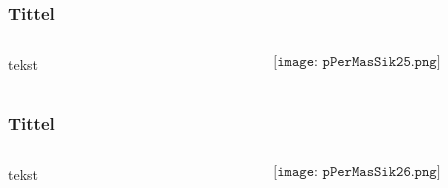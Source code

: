 \documentclass[aspectratio=169,xcolor=dvipsnames]{beamer}
\begin{document}
\begin{frame}
	\frametitle{Tittel}
	\begin{columns}
		\begin{column}{0.5\textwidth}
tekst
			
		\end{column}

		\begin{column}{0.5\textwidth}
	$$\texttt{[image: pPerMasSik25.png]}$$
		\end{column}
	\end{columns}
\end{frame}

\begin{frame}
	\frametitle{Tittel}
	\begin{columns}
		\begin{column}{0.5\textwidth}
tekst
			
		\end{column}

		\begin{column}{0.5\textwidth}
	$$\texttt{[image: pPerMasSik26.png]}$$
		\end{column}
	\end{columns}
\end{frame}
\end{document}
